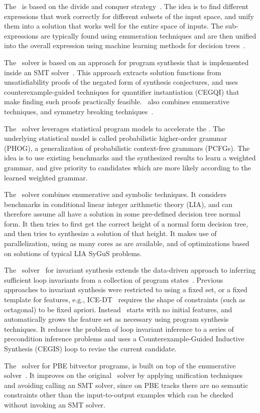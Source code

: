  The \eusolvernew\ is based on the divide and conquer strategy~\cite{AlurCAV15}. The idea is to find different expressions that work correctly for different subsets of the input space, and unify them into a solution that works well for the entire space of inputs. The sub-expressions are typically found using enumeration techniques  and are then unified into the overall expression using machine learning methods for decision trees~\cite{AlurRU17}.

 The \cvcnew\ solver is based on an approach for program synthesis that is implemented inside an SMT solver~\cite{ReynoldsDKTB15}. This approach extracts solution functions from unsatisfiability proofs of the negated form of synthesis conjectures, and uses  counterexample-guided techniques for quantifier instantiation (CEGQI) that make finding such proofs practically feasible. \cvcnew\ also combines enumerative techniques, and symmetry breaking techniques~\cite{ReynoldsT17}. 
 
 The \euphony\ solver leverages statistical program models to accelerate the \eusolver. The underlying statistical model is called probabilistic higher-order grammar (PHOG), a generalization of probabilistic context-free grammars (PCFGs). The idea is to use existing benchmarks and the synthesized results to learn a weighted grammar, and give priority to candidates which are more likely according to the learned weighted grammar.

 The \dryd\ solver combines enumerative and symbolic techniques. It considers benchmarks in conditional linear integer arithmetic theory (LIA), and can therefore assume all have a solution in some pre-defined decision tree normal form. It then tries to first get the correct height of a normal form decision tree, and then tries to synthesize a solution of that height. It makes use of parallelization, using as many cores as are available, and of optimizations based on solutions of typical LIA SyGuS problems.  
 
 The \lig\ solver~\cite{PadhiM17} for invariant synthesis extends the data-driven approach to inferring sufficient loop invariants from a collection of program states~\cite{PadhiSM16}. Previous approaches to invariant synthesis were restricted to using a fixed set, or a fixed template for features, e.g., ICE-DT~\cite{ICEDT,GNMR16} requires the shape of constraints (such as octagonal) to be fixed apriori. Instead \lig\, starts with no initial features, and automatically grows the feature set as necessary using program synthesis techniques. It reduces the problem of loop invariant inference to a series of precondition inference problems and uses a Counterexample-Guided Inductive Synthesis (CEGIS) loop to revise the current candidate.
 
 The \ethree\ solver for PBE bitvector programs, is built on top of the enumerative solver~\cite{AlurBJMRSSSTU13,UdupaRDMMA13}. It improves on the original \enum\ solver by applying unification techniques~\cite{AlurCAV15} and avoiding calling an SMT solver, since on PBE tracks there are no semantic constraints other than the input-to-output examples which can be checked without invoking an SMT solver.
